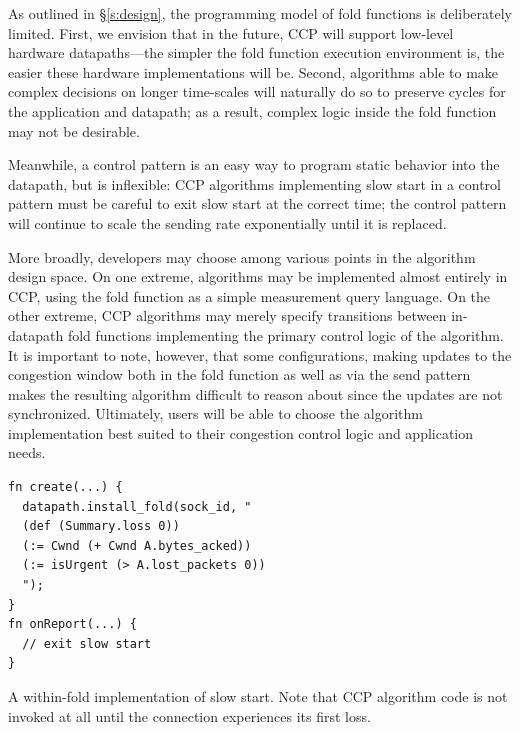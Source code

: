 As outlined in \S\ref{s:design}, the programming model of fold functions is deliberately limited.
First, we envision that in the future, CCP will support low-level hardware datapaths---the simpler the fold function execution environment is, the easier these hardware implementations will be. Second, algorithms able to make complex decisions on longer time-scales will naturally do so to preserve cycles for the application and datapath; as a result, complex logic inside the fold function may not be desirable.

Meanwhile, a control pattern is an easy way to program static behavior into the datapath, but is inflexible: CCP algorithms implementing slow start in a control pattern must be careful to exit slow start at the correct time; the control pattern will continue to scale the sending rate exponentially until it is replaced.

\smallskip

More broadly, developers may choose among various points in the algorithm design space. 
On one extreme, algorithms may be implemented almost entirely in CCP, using the fold function as a simple measurement query language.
On the other extreme, CCP algorithms may merely specify transitions between in-datapath fold functions implementing the primary control logic of the algorithm.
It is important to note, however, that some configurations, \eg making updates to the congestion window both in the fold function as well as via the send pattern makes the resulting algorithm difficult to reason about since the updates are not synchronized.
Ultimately, users will be able to choose the algorithm implementation best suited to their congestion control logic and application needs.

\begin{listing}[t]
{\footnotesize
\begin{verbatim}
fn create(...) {
  datapath.install_fold(sock_id, "
  (def (Summary.loss 0))
  (:= Cwnd (+ Cwnd A.bytes_acked))
  (:= isUrgent (> A.lost_packets 0))
  ");
}
fn onReport(...) {
  // exit slow start
}
\end{verbatim}
}
\caption{A within-fold implementation of slow start. Note that CCP algorithm code is not invoked at all until the connection experiences its first loss.} \label{lst:ccp:ssfold}
\end{listing}
